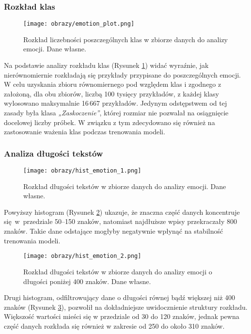 \subsubsection{Rozkład klas}
\begin{figure}[H]
    \centering
    \texttt{[image: obrazy/emotion\_plot.png]}
    \caption{Rozkład liczebności poszczególnych klas w zbiorze danych do analizy emocji. Dane własne.}
    \label{fig:emotion-class-png}
\end{figure}

Na podstawie analizy rozkładu klas (Rysunek \ref{fig:emotion-class-png}) widać wyraźnie, jak nierównomiernie rozkładają się przykłady przypisane do poszczególnych emocji. W celu uzyskania zbioru równomiernego pod względem klas i zgodnego z założoną, dla obu zbiorów, liczbą 100 tysięcy przykładów, z każdej klasy wylosowano maksymalnie 16\,667 przykładów. Jedynym odstępstwem od tej zasady była klasa \textit{„Zaskoczenie”}, której rozmiar nie pozwalał na osiągnięcie docelowej liczby próbek. W związku z tym zdecydowano się również na zastosowanie ważenia klas podczas trenowania modeli.

\subsubsection{Analiza długości tekstów}
\begin{figure}[H]
    \centering
    \texttt{[image: obrazy/hist\_emotion\_1.png]}
    \caption{Rozkład długości tekstów w zbiorze danych do analizy emocji. Dane własne.}
    \label{fig:hist-emotion-1-png}
\end{figure}
Powyższy histogram (Rysunek \ref{fig:hist-emotion-1-png}) ukazuje, że znaczna część danych koncentruje się~w~przedziale 50--150 znaków, natomiast najdłuższe wpisy przekraczały 800 znaków. Takie dane odstające mogłyby negatywnie wpłynąć na stabilność trenowania modeli.

\begin{figure}[H]
    \centering
    \texttt{[image: obrazy/hist\_emotion\_2.png]}
    \caption{Rozkład długości tekstów w zbiorze danych do analizy emocji o długości poniżej 400 znaków. Dane własne.}
    \label{fig:hist-emotion-2-png}
\end{figure}
Drugi histogram, odfiltrowujący dane o długości równej bądź większej niż 400 znaków (Rysunek \ref{fig:hist-emotion-2-png}), pozwolił na dokładniejsze uwidocznienie struktury rozkładu. Większość wartości mieści się w przedziale od 30 do 120 znaków, jednak pewna część danych rozkłada się również w zakresie od 250 do około 310 znaków.

